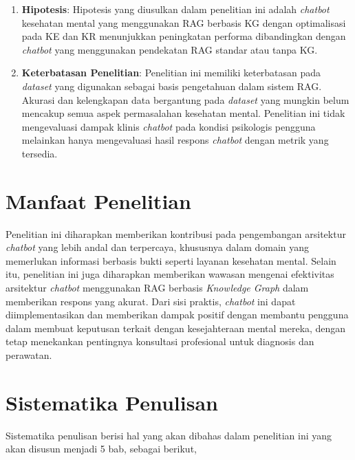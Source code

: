 \begin{enumerate}
	\item	\textbf{Hipotesis}: Hipotesis yang diusulkan dalam penelitian ini adalah \textit{chatbot} kesehatan mental yang menggunakan RAG berbasis KG dengan optimalisasi pada KE dan KR menunjukkan peningkatan performa dibandingkan dengan \textit{chatbot} yang menggunakan pendekatan RAG standar atau tanpa KG.
	\item	\textbf{Keterbatasan Penelitian}: Penelitian ini memiliki keterbatasan pada \textit{dataset} yang digunakan sebagai basis pengetahuan dalam sistem RAG.
	      Akurasi dan kelengkapan data bergantung pada \textit{dataset} yang mungkin belum mencakup semua aspek permasalahan kesehatan mental.
	      Penelitian ini tidak mengevaluasi dampak klinis \textit{chatbot} pada kondisi psikologis pengguna melainkan hanya mengevaluasi hasil respons \textit{chatbot} dengan metrik yang tersedia.
\end{enumerate}

\section{Manfaat Penelitian}
Penelitian ini diharapkan memberikan kontribusi pada pengembangan arsitektur \textit{chatbot} yang lebih andal dan terpercaya, khususnya dalam domain yang memerlukan informasi berbasis bukti seperti layanan kesehatan mental.
Selain itu, penelitian ini juga diharapkan memberikan wawasan mengenai efektivitas arsitektur \textit{chatbot} menggunakan RAG berbasis \textit{Knowledge Graph} dalam memberikan respons yang akurat.
Dari sisi praktis, \textit{chatbot} ini dapat diimplementasikan dan memberikan dampak positif dengan membantu pengguna dalam membuat keputusan terkait dengan kesejahteraan mental mereka, dengan tetap menekankan pentingnya konsultasi profesional untuk diagnosis dan perawatan.
\section{Sistematika Penulisan}
Sistematika penulisan berisi hal yang akan dibahas dalam penelitian ini yang akan disusun menjadi 5 bab, sebagai berikut,

